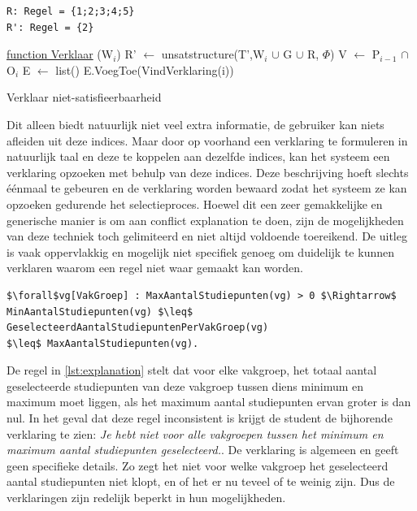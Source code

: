 \begin{lstlisting}[mathescape, caption=Unsatstructure voorbeeld\label{lst:reco}, frame=single]
R: Regel = {1;2;3;4;5}
R': Regel = {2}
\end{lstlisting}

\begin{algorithm}
	\underline{function Verklaar} (W$_{i}$)\;
	R' $\leftarrow$ unsatstructure(T',W$_{i}$ $\cup$ G $\cup$ R, $\Phi$)\;
	V $\leftarrow$ P$_{i-1}$ $\cap$ O$_{i}$\;
	E $\leftarrow$ list()\;
		{
		E.VoegToe(VindVerklaring(i))\;
		}
	\caption{Verklaar niet-satisfieerbaarheid\label{alg:verklaar}}
\end{algorithm}

Dit alleen biedt natuurlijk niet veel extra informatie, de gebruiker kan niets afleiden uit deze indices. Maar door op voorhand een verklaring te formuleren in natuurlijk taal en deze te koppelen aan dezelfde indices, kan het systeem een verklaring opzoeken met behulp van deze indices. Deze beschrijving hoeft slechts \'{e}\'{e}nmaal te gebeuren en de verklaring worden bewaard zodat het systeem ze kan opzoeken gedurende het selectieproces. Hoewel dit een zeer gemakkelijke en generische manier is om aan conflict explanation te doen, zijn de mogelijkheden van deze techniek toch gelimiteerd en niet altijd voldoende toereikend. De uitleg is vaak oppervlakkig en mogelijk niet specifiek genoeg om duidelijk te kunnen verklaren waarom een regel niet waar gemaakt kan worden. 

\lstset{basicstyle=\scriptsize}
\begin{lstlisting}[mathescape, caption=Voorbeeld verklaring\label{lst:explanation}, frame=single]
$\forall$vg[VakGroep] : MaxAantalStudiepunten(vg) > 0 $\Rightarrow$ 
MinAantalStudiepunten(vg) $\leq$ GeselecteerdAantalStudiepuntenPerVakGroep(vg) 
$\leq$ MaxAantalStudiepunten(vg).
\end{lstlisting}

De regel in \ref{lst:explanation} stelt dat voor elke vakgroep, het totaal aantal geselecteerde studiepunten van deze vakgroep tussen diens minimum en maximum moet liggen, als het maximum aantal studiepunten ervan groter is dan nul. In het geval dat deze regel inconsistent is krijgt de student de bijhorende verklaring te zien: \textit{Je hebt niet voor alle vakgroepen tussen het minimum en maximum aantal studiepunten geselecteerd.}. De verklaring is algemeen en geeft geen specifieke details. Zo zegt het niet voor welke vakgroep het geselecteerd aantal studiepunten niet klopt, en of het er nu teveel of te weinig zijn. Dus de verklaringen zijn redelijk beperkt in hun mogelijkheden. 

